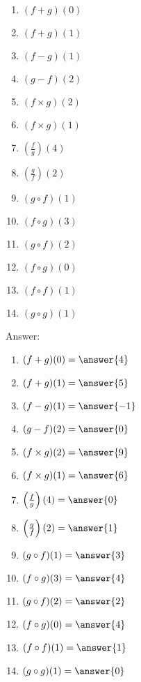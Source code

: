 \documentclass{ximera}
\begin{document}
\begin{exercise}
\begin{multicols}{4}
\begin{enumerate}
\item  $(f+g)(0)$ \label{twofuncgraphsfirst}
\item  $(f+g)(1)$
\item  $(f-g)(1)$
\item  $(g-f)(2)$
\item  $(f\times g)(2)$
\item  $(f\times g)(1)$
\item  $\left(\frac{f}{g}\right)(4)$
\item  $\left(\frac{g}{f}\right)(2)$ \label{twofuncgraphslast}
\item  $(g\circ f)(1)$ \label{twofuncgraphcompfirst}
\item  $(f \circ g)(3)$
\item  $(g\circ f)(2)$
\item  $(f\circ g)(0)$  
\item  $(f\circ f)(1)$
\item  $(g \circ g)(1)$
\end{enumerate}
\end{multicols}

Answer:

\begin{multicols}{3}
\begin{enumerate}
\item  $(f+g)(0)=\answer{4}$
\item  $(f+g)(1)=\answer{5}$
\item  $(f-g)(1)=\answer{-1}$
\item  $(g-f)(2)=\answer{0}$
\item  $(f\times g)(2)=\answer{9}$
\item  $(f\times g)(1)=\answer{6}$
\item  $\left(\frac{f}{g}\right)(4)=\answer{0}$
\item  $\left(\frac{g}{f}\right)(2)=\answer{1}$
\item  $(g\circ f)(1)=\answer{3}$ 
\item  $(f \circ g)(3)=\answer{4}$
\item  $(g\circ f)(2)=\answer{2}$
\item  $(f\circ g)(0)=\answer{4}$  
\item  $(f\circ f)(1)=\answer{1}$
\item  $(g \circ g)(1)=\answer{0}$
\end{enumerate}
\end{multicols}

\end{exercise}
\end{document}
